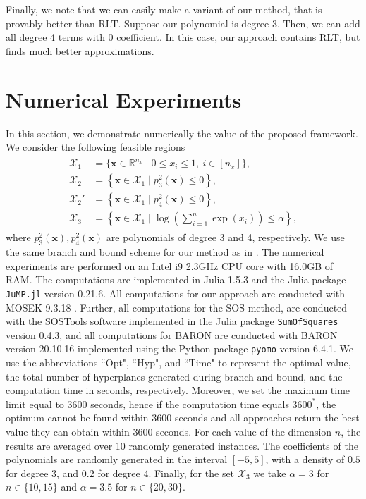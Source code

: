 \documentclass[opre,nonblindrev]{informs3} %
\begin{document}
{\color{black} Finally, we note that we can easily make a variant of our method, that is provably better than RLT. Suppose our polynomial is degree 3. Then, we can add all degree 4 terms with 0 coefficient. In this case, our approach contains RLT, but finds much better approximations.}

\section{Numerical Experiments}  
In this section, we demonstrate numerically the value of the proposed framework. We consider the following feasible regions 
\begin{align*}
	\begin{array}{cll}
	\displaystyle \mathcal{X}_1 &= \displaystyle \{\boldsymbol{x} \in \mathbb{R}^{n_x} \mid 0 \le x_i \le 1, \ i \in [n_x] \}, \\
	\displaystyle \mathcal{X}_2 &= \displaystyle \left\{ \boldsymbol{x} \in \mathcal{X}_1 \mid p_3^2(\boldsymbol{x}) \le 0 \right\}, \\ 
    \displaystyle \mathcal{X}_2' &= \left\{ \boldsymbol{x} \in \mathcal{X}_1 \mid p_4^2(\boldsymbol{x}) \le 0 \right\}, \\
       \displaystyle \mathcal{X}_3 &= \displaystyle \left\{ \boldsymbol{x} \in \mathcal{X}_1 \mid \log\left( \sum_{i=1}^n \exp(x_i) \right) \le \alpha \right\},
	\end{array}
\end{align*}  
where $p_3^2(\boldsymbol{x}),p_4^2(\boldsymbol{x})$ are polynomials of degree 3 and 4, respectively. We use the same branch and bound scheme for our method as in \cite{bertsimas2023novel}. The numerical experiments are performed on an Intel i9 2.3GHz CPU core with 16.0GB of RAM. The computations are implemented in Julia 1.5.3 and the Julia package \texttt{JuMP.jl} version 0.21.6. All computations for our approach are conducted with MOSEK 9.3.18 \cite{mosek101}. Further, all computations for the SOS method, are conducted with the SOSTools software \cite{prajna2002introducing} implemented in the Julia package \texttt{SumOfSquares} version 0.4.3, and all computations for BARON are conducted with BARON version 20.10.16 \cite{sahinidis1996baron} implemented using the Python package \texttt{pyomo} version 6.4.1. We use the abbreviations ``Opt", ``Hyp", and ``Time" to represent the optimal value, the total number of hyperplanes generated during branch and bound, and the computation time in seconds, respectively. Moreover, we set the maximum time limit equal to 3600 seconds, hence if the computation time equals $3600^*$, the optimum cannot be found within 3600 seconds and all approaches return the best value they can obtain within 3600 seconds. For each value of the dimension $n$, the results are averaged over 10 randomly generated instances. The coefficients of the polynomials are randomly generated in the interval $[-5,5]$, with a density of $0.5$ for degree 3, and $0.2$ for degree 4. Finally, for the set $\mathcal{X}_3$ we take $\alpha=3$ for $n \in \{10,15\}$ and $\alpha=3.5$ for $n \in \{20,30\}$. 
\end{document}
